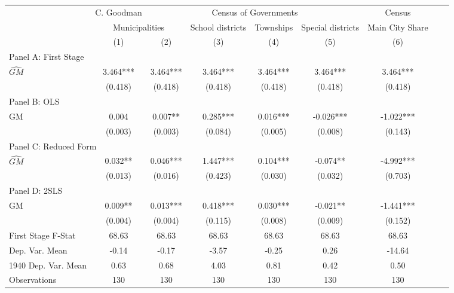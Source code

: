  \begin{tabular}{l*{8}{c}} \toprule
&\multicolumn{1}{c}{C. Goodman}&\multicolumn{4}{c}{Census of Governments}&\multicolumn{1}{c}{Census}\\\cmidrule(lr){2-2}\cmidrule(lr){3-6}\cmidrule(lr){7-7}
&\multicolumn{2}{c}{Municipalities}&\multicolumn{1}{c}{School districts}&\multicolumn{1}{c}{Townships}&\multicolumn{1}{c}{Special districts}&\multicolumn{1}{c}{Main City Share}\\\cmidrule(lr){2-3}\cmidrule(lr){4-6}\cmidrule(lr){7-7}
&\multicolumn{1}{c}{(1)}&\multicolumn{1}{c}{(2)}&\multicolumn{1}{c}{(3)}&\multicolumn{1}{c}{(4)}&\multicolumn{1}{c}{(5)}&\multicolumn{1}{c}{(6)}\\
\cmidrule(lr){1-7}
\multicolumn{6}{l}{Panel A: First Stage}\\
\cmidrule(lr){1-7}
$\widehat{GM}$  &    3.464***&    3.464***&    3.464***&    3.464***&    3.464***&    3.464***\\
                &  (0.418)   &  (0.418)   &  (0.418)   &  (0.418)   &  (0.418)   &  (0.418)   \\
\cmidrule(lr){1-7}
\multicolumn{6}{l}{Panel B: OLS}\\
\cmidrule(lr){1-7}
GM              &    0.004   &    0.007** &    0.285***&    0.016***&   -0.026***&   -1.022***\\
                &  (0.003)   &  (0.003)   &  (0.084)   &  (0.005)   &  (0.008)   &  (0.143)   \\
\cmidrule(lr){1-7}
\multicolumn{6}{l}{Panel C: Reduced Form}\\
\cmidrule(lr){1-7}
$\widehat{GM}$  &    0.032** &    0.046***&    1.447***&    0.104***&   -0.074** &   -4.992***\\
                &  (0.013)   &  (0.016)   &  (0.423)   &  (0.030)   &  (0.032)   &  (0.703)   \\
\cmidrule(lr){1-7}
\multicolumn{6}{l}{Panel D: 2SLS}\\
\cmidrule(lr){1-7}
GM              &    0.009** &    0.013***&    0.418***&    0.030***&   -0.021** &   -1.441***\\
                &  (0.004)   &  (0.004)   &  (0.115)   &  (0.008)   &  (0.009)   &  (0.152)   \\
\midrule
First Stage F-Stat&    68.63   &    68.63   &    68.63   &    68.63   &    68.63   &    68.63   \\
Dep. Var. Mean  &    -0.14   &    -0.17   &    -3.57   &    -0.25   &     0.26   &   -14.64   \\
1940 Dep. Var. Mean&     0.63   &     0.68   &     4.03   &     0.81   &     0.42   &     0.50   \\
Observations    &      130   &      130   &      130   &      130   &      130   &      130   \\
       \bottomrule \end{tabular}
